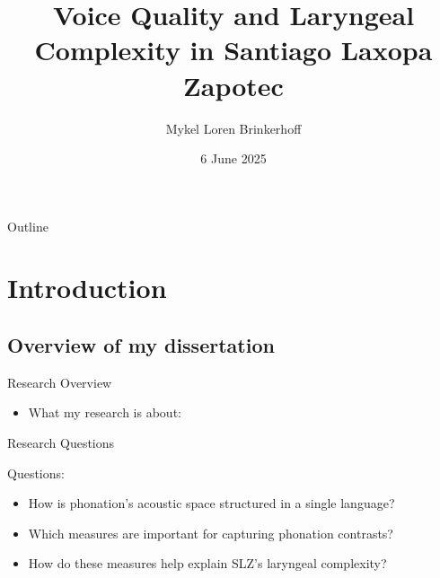 \documentclass{beamer}
\title[Voice Quality in SLZ] %
{Voice Quality and Laryngeal Complexity in Santiago Laxopa Zapotec}
\author[Brinkerhoff] %
{Mykel Loren Brinkerhoff}
\institute[UC Santa Cruz] %
{University of California, Santa Cruz}
\date[2025-06-06] %
{6 June 2025}
\begin{document}
\begin{frame}
  \titlepage
\end{frame}

\begin{frame}{Outline}
  \tableofcontents
\end{frame}




\section{Introduction}
\subsection{Overview of my dissertation}

\begin{frame}{Research Overview}
  \begin{itemize}
    \item What my research is about:
  \end{itemize}
\end{frame}

\begin{frame}{Research Questions}
  \begin{block}{Questions:}
    \begin{itemize}
      \item How is phonation's acoustic space structured in a single language?
      \item Which measures are important for capturing phonation contrasts?
      \item How do these measures help explain SLZ's laryngeal complexity?
    \end{itemize}
  \end{block}
\end{frame}
\end{document}
